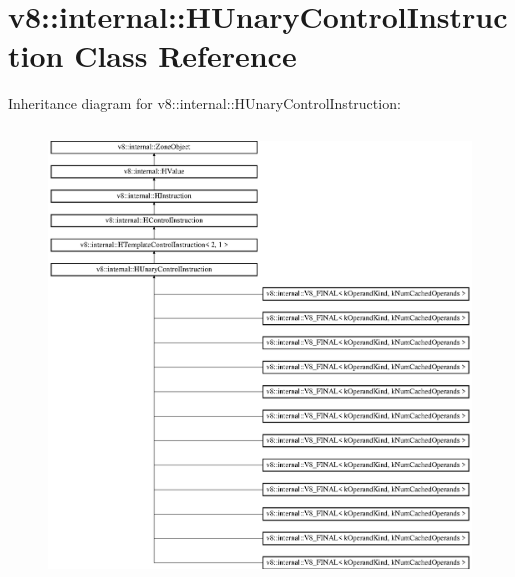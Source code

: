 \hypertarget{classv8_1_1internal_1_1_h_unary_control_instruction}{}\section{v8\+:\+:internal\+:\+:H\+Unary\+Control\+Instruction Class Reference}
\label{classv8_1_1internal_1_1_h_unary_control_instruction}
Inheritance diagram for v8\+:\+:internal\+:\+:H\+Unary\+Control\+Instruction\+:\begin{figure}[H]
\begin{center}
\leavevmode
\includegraphics[height=12.000000cm]{classv8_1_1internal_1_1_h_unary_control_instruction}
\end{center}
\end{figure}
